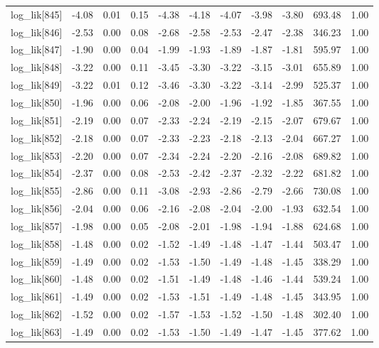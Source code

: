 \begin{table}[ht]
\begin{tabular}{rrrrrrrrrrr}
  log\_lik[845] & -4.08 & 0.01 & 0.15 & -4.38 & -4.18 & -4.07 & -3.98 & -3.80 & 693.48 & 1.00 \\ 
  log\_lik[846] & -2.53 & 0.00 & 0.08 & -2.68 & -2.58 & -2.53 & -2.47 & -2.38 & 346.23 & 1.00 \\ 
  log\_lik[847] & -1.90 & 0.00 & 0.04 & -1.99 & -1.93 & -1.89 & -1.87 & -1.81 & 595.97 & 1.00 \\ 
  log\_lik[848] & -3.22 & 0.00 & 0.11 & -3.45 & -3.30 & -3.22 & -3.15 & -3.01 & 655.89 & 1.00 \\ 
  log\_lik[849] & -3.22 & 0.01 & 0.12 & -3.46 & -3.30 & -3.22 & -3.14 & -2.99 & 525.37 & 1.00 \\ 
  log\_lik[850] & -1.96 & 0.00 & 0.06 & -2.08 & -2.00 & -1.96 & -1.92 & -1.85 & 367.55 & 1.00 \\ 
  log\_lik[851] & -2.19 & 0.00 & 0.07 & -2.33 & -2.24 & -2.19 & -2.15 & -2.07 & 679.67 & 1.00 \\ 
  log\_lik[852] & -2.18 & 0.00 & 0.07 & -2.33 & -2.23 & -2.18 & -2.13 & -2.04 & 667.27 & 1.00 \\ 
  log\_lik[853] & -2.20 & 0.00 & 0.07 & -2.34 & -2.24 & -2.20 & -2.16 & -2.08 & 689.82 & 1.00 \\ 
  log\_lik[854] & -2.37 & 0.00 & 0.08 & -2.53 & -2.42 & -2.37 & -2.32 & -2.22 & 681.82 & 1.00 \\ 
  log\_lik[855] & -2.86 & 0.00 & 0.11 & -3.08 & -2.93 & -2.86 & -2.79 & -2.66 & 730.08 & 1.00 \\ 
  log\_lik[856] & -2.04 & 0.00 & 0.06 & -2.16 & -2.08 & -2.04 & -2.00 & -1.93 & 632.54 & 1.00 \\ 
  log\_lik[857] & -1.98 & 0.00 & 0.05 & -2.08 & -2.01 & -1.98 & -1.94 & -1.88 & 624.68 & 1.00 \\ 
  log\_lik[858] & -1.48 & 0.00 & 0.02 & -1.52 & -1.49 & -1.48 & -1.47 & -1.44 & 503.47 & 1.00 \\ 
  log\_lik[859] & -1.49 & 0.00 & 0.02 & -1.53 & -1.50 & -1.49 & -1.48 & -1.45 & 338.29 & 1.00 \\ 
  log\_lik[860] & -1.48 & 0.00 & 0.02 & -1.51 & -1.49 & -1.48 & -1.46 & -1.44 & 539.24 & 1.00 \\ 
  log\_lik[861] & -1.49 & 0.00 & 0.02 & -1.53 & -1.51 & -1.49 & -1.48 & -1.45 & 343.95 & 1.00 \\ 
  log\_lik[862] & -1.52 & 0.00 & 0.02 & -1.57 & -1.53 & -1.52 & -1.50 & -1.48 & 302.40 & 1.00 \\ 
  log\_lik[863] & -1.49 & 0.00 & 0.02 & -1.53 & -1.50 & -1.49 & -1.47 & -1.45 & 377.62 & 1.00 \\ 

\end{tabular}
\end{table}
